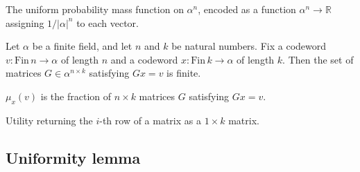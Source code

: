 \begin{definition}
\label{ErrorCorrectingCodes.Codeword.uniform_vector_dist}
\leanok
{}
The uniform probability mass function on $\alpha^n$, encoded as a function
$\alpha^n\to\mathbb{R}$ assigning $1/|\alpha|^n$ to each vector.
\end{definition}

\begin{lemma}
\label{ErrorCorrectingCodes.Codeword.finite_matrix_dist}
\leanok
{}
Let $\alpha$ be a finite field, and let $n$ and $k$ be natural numbers. Fix a codeword
$v : \mathrm{Fin}\,n \to \alpha$ of length $n$ and a codeword $x : \mathrm{Fin}\,k \to
\alpha$ of length $k$. Then the set of matrices $G \in \alpha^{n \times k}$ satisfying
$Gx = v$ is finite.
\end{lemma}

\begin{definition}
\label{ErrorCorrectingCodes.Codeword.matrix_dist}
\leanok
{}
$\mu_x(v)$ is the fraction of $n\times k$ matrices $G$ satisfying $Gx=v$.
\end{definition}

\begin{definition}
\label{ErrorCorrectingCodes.Codeword.get_matrix_row}
\leanok
Utility returning the $i$-th row of a matrix as a $1\times k$ matrix.
\end{definition}

\subsection{Uniformity lemma}

